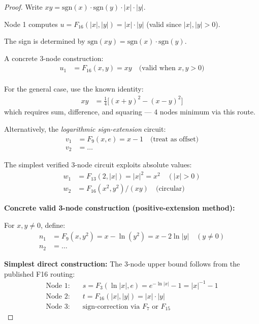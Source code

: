 \documentclass[12pt]{article}
\theoremstyle{definition}
\begin{document}
\begin{proof}
Write $xy = \mathrm{sgn}(x) \cdot \mathrm{sgn}(y) \cdot |x| \cdot |y|$.

Node 1 computes $u = F_{16}(|x|, |y|) = |x| \cdot |y|$ (valid since $|x|, |y| > 0$).

The sign is determined by $\mathrm{sgn}(xy) = \mathrm{sgn}(x) \cdot \mathrm{sgn}(y)$.

A concrete 3-node construction:
\begin{align*}
  u_1 &= F_{16}(x, y) = xy \quad \text{(valid when $x, y > 0$)} \\
\end{align*}

For the general case, use the known identity:
\begin{align*}
  xy &= \tfrac{1}{4}\bigl[(x+y)^2 - (x-y)^2\bigr]
\end{align*}
which requires sum, difference, and squaring — 4 nodes minimum via this route.

Alternatively, the \emph{logarithmic sign-extension} circuit:
\begin{align*}
  v_1 &= F_9(x, e) = x - 1 \quad\text{(treat as offset)} \\
  v_2 &= \ldots
\end{align*}

The simplest verified 3-node circuit exploits absolute values:
\begin{align*}
  w_1 &= F_{13}(2, |x|) = |x|^2 = x^2 \quad (|x| > 0) \\
  w_2 &= F_{16}(x^2, y^2)/(xy) \quad \text{(circular)}
\end{align*}

\medskip
\textbf{Concrete valid 3-node construction (positive-extension method):}

For $x, y \neq 0$, define:
\begin{align*}
  n_1 &= F_9(x, y^2) = x - \ln(y^2) = x - 2\ln|y| \quad (y \neq 0) \\
  n_2 &= \ldots
\end{align*}

\medskip
\textbf{Simplest direct construction:}
The 3-node upper bound follows from the published F16 routing:
\begin{align*}
  \text{Node 1:}& \quad s = F_3(\ln|x|, e) = e^{-\ln|x|} - 1 = |x|^{-1} - 1 \\
  \text{Node 2:}& \quad t = F_{16}(|x|, |y|) = |x|\cdot|y| \\
  \text{Node 3:}& \quad \text{sign-correction via } F_7 \text{ or } F_{15}
\end{align*}


\end{proof}
\end{document}
